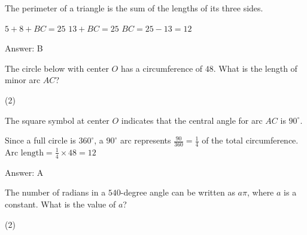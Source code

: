 \documentclass[11pt,paper=a4,answers]{exam}
\begin{document}
\begin{questions}
\begin{solution}
The perimeter of a triangle is the sum of the lengths of its three sides.
\vspace{5pt}
\begin{center}
$5 + 8 + BC = 25$
\vspace{5pt}
$13 + BC = 25$
\vspace{5pt}
$BC = 25 - 13 = 12$
\end{center}
\vspace{5pt}
Answer: \colorbox{yellow!100}{B}
\end{solution}

\vspace{1cm}

\question
The circle below with center $O$ has a circumference of $48$. What is the length of minor arc $AC$?
\begin{center}
\end{center}
\begin{tasks}(2)
\end{tasks}

\begin{solution}
The square symbol at center $O$ indicates that the central angle for arc $AC$ is $90^\circ$. 
\vspace{5pt}
\begin{center}
Since a full circle is $360^\circ$, a $90^\circ$ arc represents $\frac{90}{360} = \frac{1}{4}$ of the total circumference.
\vspace{5pt}
$\text{Arc length} = \frac{1}{4} \times 48 = 12$
\end{center}
\vspace{5pt}
Answer: \colorbox{yellow!100}{A}
\end{solution}

\vspace{1cm}

\question
The number of radians in a $540$-degree angle can be written as $a\pi$, where $a$ is a constant. What is the value of $a$?
\begin{tasks}(2)
\end{tasks}


\end{questions}
\end{document}
